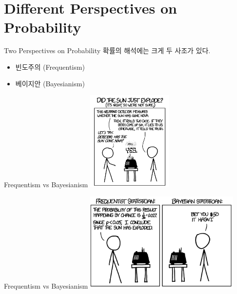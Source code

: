 \documentclass{beamer}
\begin{document}







\section{Different Perspectives on Probability} 

\begin{frame}{Two Perspectives on Probability} 
확률의 해석에는 크게 두 사조가 있다. 

\begin{itemize} 
\item 빈도주의 (Frequentism) 
\item 베이지안 (Bayesianism)
\end{itemize}

\end{frame}

\begin{frame}[allowframebreaks]{Frequentism vs Bayesianism} 
\includegraphics[height=5cm,keepaspectratio]{xkcd}
\end{frame}

\begin{frame}[allowframebreaks]{Frequentism vs Bayesianism} 
\includegraphics[height=5cm,keepaspectratio]{xkcd2}
\end{frame}
\end{document}
